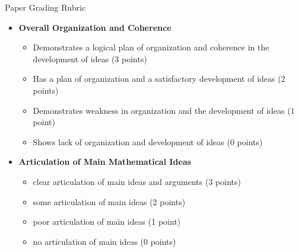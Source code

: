 \documentclass[11pt,letterpaper]{article}
\begin{document}
\indent Paper Grading Rubric

\begin{itemize}

\item\textbf{Overall Organization and Coherence}
\begin{itemize}
\item[\underline{\hspace{.2in}}] Demonstrates a logical plan of organization and coherence 
in the development of ideas (3 points)
\item[\underline{\hspace{.2in}}] Has a plan of organization and a satisfactory development of ideas (2 points)
\item[\underline{\hspace{.2in}}]  Demonstrates weakness in organization and the development of ideas (1 point)
\item[\underline{\hspace{.2in}}]  Shows lack of organization and 
development of ideas (0 points)
\end{itemize}

\item  \textbf{Articulation of Main Mathematical Ideas}
\begin{itemize}
\item[\underline{\hspace{.2in}}]  clear articulation of main ideas and arguments (3 points)
\item[\underline{\hspace{.2in}}] some articulation of main ideas (2 points)
\item[\underline{\hspace{.2in}}]  poor articulation of main ideas (1 point)
\item[\underline{\hspace{.2in}}] no articulation of main ideas (0 points)
\end{itemize}


\end{itemize}
\end{document}
